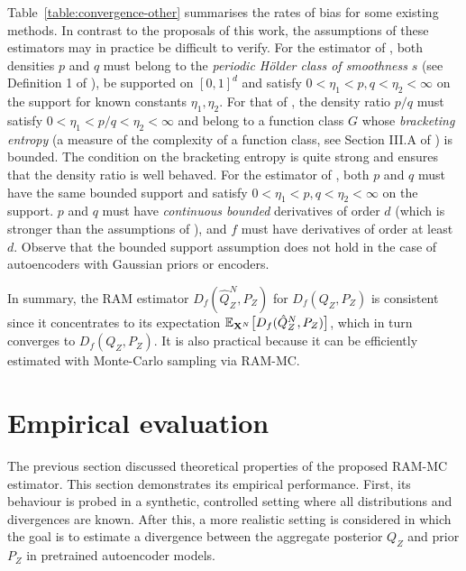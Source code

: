 Table~\ref{table:convergence-other} summarises the rates of bias for some existing methods.
In contrast to the proposals of this work, the assumptions of these estimators may in practice be difficult to verify.
For the estimator of \cite{krishnamurthy14icml}, both densities $p$ and $q$ must belong to the \emph{periodic H\"older class of smoothness} $s$ (see Definition 1 of \cite{krishnamurthy14icml}), be supported on $[0,1]^d$ and satisfy $0<\eta_1 < p, q < \eta_2<\infty$ on the support for known constants $\eta_1, \eta_2$.
For that of \cite{nguyen10ratio}, the density ratio $p/q$ must satisfy $0<\eta_1 < p/q < \eta_2<\infty$ and belong to a function class $G$ whose \emph{bracketing entropy} (a measure of the complexity of a function class, see Section III.A of \cite{nguyen10ratio}) is bounded. The condition on the bracketing entropy is quite strong and ensures that the density ratio is well behaved.
For the estimator of \cite{moon14ensemble}, both $p$ and $q$ must have the same bounded support and satisfy $0<\eta_1 < p, q < \eta_2<\infty$ on the support. $p$ and $q$ must have \emph{continuous bounded} derivatives of order $d$ (which is stronger than the assumptions of \cite{krishnamurthy14icml}), and $f$ must have derivatives of order at least $d$.
Observe that the bounded support assumption does not hold in the case of autoencoders with Gaussian priors or encoders.

In summary, the RAM estimator $D_f(\hat{Q}_Z^N , P_Z)$ for $D_f(Q_Z , P_Z)$ is consistent since it concentrates to its expectation $\mathbb{E}_{\mathbf{X}^N}\bigl[D_f(\hat{Q}_Z^N , P_Z)\bigr]$, which in turn converges to $D_f(Q_Z , P_Z)$.
It is also practical because it can be efficiently estimated with Monte-Carlo sampling via RAM-MC.

\section{Empirical evaluation}\label{sec:experiments}

The previous section discussed theoretical properties of the proposed RAM-MC estimator.
This section demonstrates its empirical performance.
First, its behaviour is probed in a synthetic, controlled setting where all distributions and divergences are known.
After this, a more realistic setting is considered in which the goal is to estimate a divergence between the aggregate posterior $Q_Z$ and prior $P_Z$ in pretrained autoencoder models. 


